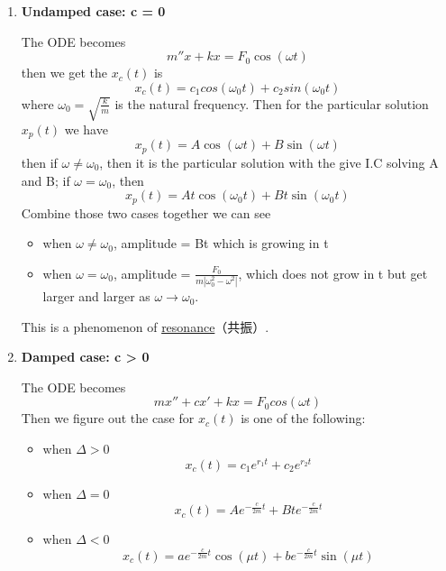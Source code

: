 \documentclass[9pt]{article}
\theoremstyle{definition}
\newenvironment{changemargin}[2]{%
  \begin{list}{}{%
    \setlength{\topsep}{0pt}%
    \setlength{\leftmargin}{#1}%
    \setlength{\rightmargin}{#2}%
    \setlength{\listparindent}{\parindent}%
    \setlength{\itemindent}{\parindent}%
    \setlength{\parsep}{\parskip}%
  }%
  \item[]}{\end{list}}
\theoremstyle{theorem}
\theoremstyle{remark}
\theoremstyle{lemma}
\begin{document}
\begin{changemargin}{-0.125in}{0in}
\begin{enumerate}
\begin{enumerate}
        \medskip
         
        \item \textbf{Undamped case: c = 0}
        
        \medskip
        
        The ODE becomes 
        \[
        m''x + kx = F_0\cos (\omega t)
        \]
        then we get the $x_c(t)$ is 
        \[
        x_c(t) = c_1 cos (\omega_0 t) + c_2 sin(\omega_0 t)
        \]
        where $\omega_0 = \sqrt{\frac{k}{m}}$ is the natural frequency. Then for the particular solution $x_p(t)$ we have 
        \[
        x_p(t) = A\cos(\omega t) + B \sin (\omega t)
        \]
        then if $\omega \neq \omega_0$, then it is the particular solution with the give I.C solving A and B; if $\omega = \omega_0$, then 
        \[
        x_p(t) = At \cos (\omega_0 t) + Bt \sin (\omega_0 t)
        \]
        Combine those two cases together we can see 
        \begin{itemize}
        	\item when $\omega \neq \omega_0$, amplitude = Bt which is growing in t
        	\item when $\omega = \omega_0$, amplitude = $\frac{F_0}{m|\omega^2_0 - \omega^2|}$, which does not grow in t but get larger and larger as $\omega \rightarrow \omega_0$.
        \end{itemize}
        This is a phenomenon of \underline{resonance}（共振）.
        
        \medskip
        
        \item \textbf{Damped case: c > 0}
        
        \medskip
        
        The ODE becomes 
        \[
        mx'' + cx' + kx = F_0cos(\omega t)
        \]
        Then we figure out the case for $x_c(t)$ is one of the following: 
        \begin{itemize}
        	\item when $\Delta > 0$
        	\[
        	x_c(t) = c_1e^{r_1t} + c_2e^{r_2t}
        	\]
        	\item when $\Delta = 0$
        	\[
        	x_c(t) = Ae^{-\frac{c}{2m}t} + Bte^{-\frac{c}{2m}t}
        	\]
            \item when $\Delta < 0$
            \[
            x_c(t) = ae^{-\frac{c}{2m}t}\cos( \mu t) + be^{-\frac{c}{2m}t} \sin (\mu t)
            \]
            
            \smallskip
            

\end{itemize}
\end{enumerate}
\end{enumerate}
\end{changemargin}
\end{document}
